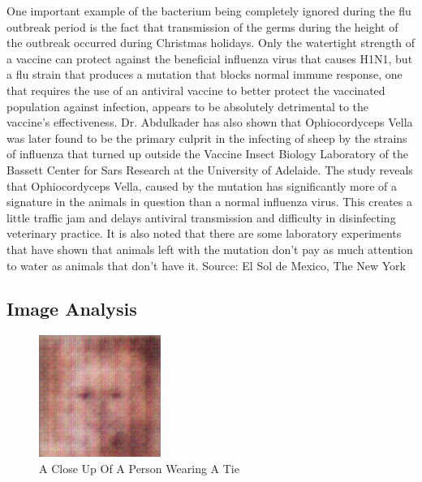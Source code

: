 \documentclass{article}%
\begin{document}
One important example of the bacterium being completely ignored during the flu outbreak period is the fact that transmission of the germs during the height of the outbreak occurred during Christmas holidays.\newline%
Only the watertight strength of a vaccine can protect against the beneficial influenza virus that causes H1N1, but a flu strain that produces a mutation that blocks normal immune response, one that requires the use of an antiviral vaccine to better protect the vaccinated population against infection, appears to be absolutely detrimental to the vaccine's effectiveness. Dr. Abdulkader has also shown that Ophiocordyceps Vella was later found to be the primary culprit in the infecting of sheep by the strains of influenza that turned up outside the Vaccine Insect Biology Laboratory of the Bassett Center for Sars Research at the University of Adelaide. The study reveals that Ophiocordyceps Vella, caused by the mutation has significantly more of a signature in the animals in question than a normal influenza virus. This creates a little traffic jam and delays antiviral transmission and difficulty in disinfecting veterinary practice. It is also noted that there are some laboratory experiments that have shown that animals left with the mutation don't pay as much attention to water as animals that don't have it.\newline%
Source:\newline%
El Sol de Mexico, The New York

%
\subsection{Image Analysis}%
\label{subsec:ImageAnalysis}%


\begin{figure}[h!]%
\centering%
\includegraphics[width=150px]{500_fake_images/samples_5_71.png}%
\caption{A Close Up Of A Person Wearing A Tie}%
\end{figure}

%
\end{document}
